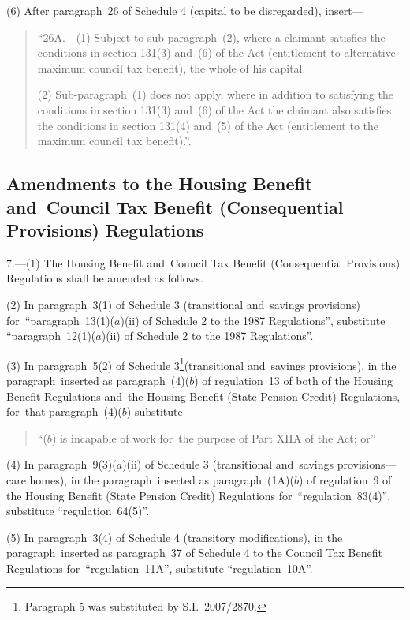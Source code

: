 \documentclass[12pt,a4paper]{article}
\begin{document}
(6) After paragraph~26 of Schedule 4 (capital to be disregarded), insert—
\begin{quotation}
“26A.---(1)  Subject to sub-paragraph~(2), where a claimant satisfies the conditions in section 131(3) and~(6) of the Act (entitlement to alternative maximum council tax benefit), the whole of his capital.

(2) Sub-paragraph~(1) does not apply, where in addition to satisfying the conditions in section 131(3) and~(6) of the Act the claimant also satisfies the conditions in section 131(4) and~(5) of the Act (entitlement to the maximum council tax benefit).”.
\end{quotation}

\subsection[7. Amendments to the Housing Benefit and~Council Tax Benefit (Consequential Provisions) Regulations]{Amendments to the Housing Benefit and~Council Tax Benefit (Consequential Provisions) Regulations}

7.---(1)  The Housing Benefit and~Council Tax Benefit (Consequential Provisions) Regulations shall be amended as follows.

(2) In paragraph~3(1) of Schedule 3 (transitional and~savings provisions) for~“paragraph~13(1)($a$)(ii)  of Schedule 2 to the 1987 Regulations”, substitute “paragraph~12(1)($a$)(ii)  of Schedule 2 to the 1987 Regulations”.

(3) In paragraph~5(2) of Schedule 3\footnote{Paragraph 5 was substituted by S.I.~2007/2870.}(transitional and~savings provisions), in the paragraph~inserted as paragraph~(4)($b$)  of regulation~13 of both of the Housing Benefit Regulations and~the Housing Benefit (State Pension Credit) Regulations, for~that paragraph~(4)($b$)  substitute—
\begin{quotation}
“($b$) is incapable of work for~the purpose of Part XIIA of the Act; or”
\end{quotation}

(4) In paragraph~9(3)($a$)(ii)  of Schedule 3 (transitional and~savings provisions---care homes), in the paragraph~inserted as paragraph~(1A)($b$)  of regulation~9 of the Housing Benefit (State Pension Credit) Regulations for~“regulation~83(4)”, substitute “regulation~64(5)”.

(5) In paragraph~3(4) of Schedule 4 (transitory modifications), in the paragraph~inserted as paragraph~37 of Schedule 4 to the Council Tax Benefit Regulations for~“regulation~11A”, substitute “regulation~10A”. 
\end{document}
